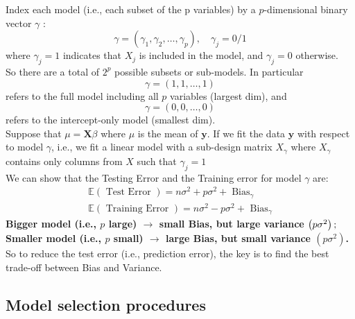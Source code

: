 \documentclass[11pt,a4paper]{article}
\begin{document}
Index each model (i.e., each subset of the p variables) by a $p$-dimensional binary vector $\gamma$ :
$$
\gamma=\left(\gamma_{1}, \gamma_{2}, \ldots, \gamma_{p}\right), \quad \gamma_{j}=0 / 1
$$
where $\gamma_{j}=1$ indicates that $X_{j}$ is included in the model, and $\gamma_{j}=0$ otherwise.\\
So there are a total of $2^{p}$ possible subsets or sub-models. In particular
$$
\gamma=(1,1, \ldots, 1)
$$
refers to the full model including all $p$ variables (largest dim), and
$$
\gamma=(0,0, \ldots, 0)
$$
refers to the intercept-only model (smallest dim).\\
Suppose that $\mu=\mathbf{X} \beta$ where $\mu$ is the mean of $\mathbf{y}$. If we fit the data $\mathbf{y}$ with respect to model $\gamma$, i.e., we fit a linear model with a sub-design matrix $X_{\gamma}$ where $X_{\gamma}$ contains only columns from $X$ such that $\gamma_{j}=1$\\
We can show that the Testing Error and the Training error for model $\gamma$ are:
$$
\begin{array}{r}
\mathbb{E}(\text { Test Error })=n \sigma^{2}+p \sigma^{2}+\operatorname{Bias}_{\gamma} \\
\mathbb{E}(\text { Training Error })=n \sigma^{2}-p \sigma^{2}+\text { Bias}_{\gamma}
\end{array}
$$
\textbf{Bigger model (i.e., $p$ large) $\rightarrow$ small Bias, but large variance $\left(p \sigma^{2}\right) ;\\
$ Smaller model (i.e., $p$ small) $\rightarrow$ large Bias, but small variance $\left(p \sigma^{2}\right)$.}\\
So to reduce the test error (i.e., prediction error), the key is to find the best trade-off between Bias and Variance.

\subsection{Model selection procedures}
\end{document}
